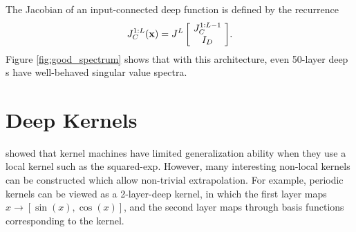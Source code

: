 %
%
%
The Jacobian of an input-connected deep function is defined by the recurrence
%
\newcommand{\sbi}[2]{\left[ \! \begin{array}{c} #1 \\ #2 \end{array} \! \right]} 
\begin{align}
{J_C^{1:L}(\vx) = J^L \sbi{ J_C^{1:L-1}}{I_D}}.
\end{align}
%
%
%
Figure \ref{fig:good_spectrum} shows that with this architecture, even 50-layer deep \gp{}s have well-behaved singular value spectra.














\section{Deep Kernels}
\label{sec:deep_kernels}


\cite{ bengio2006curse} showed that kernel machines have limited generalization ability when they use a local kernel such as the squared-exp.
However, many interesting non-local kernels can be constructed which allow non-trivial extrapolation.
For example, periodic kernels can be viewed as a 2-layer-deep kernel, in which the first layer maps $x \rightarrow [\sin(x), \cos(x)]$, and the second layer maps through basis functions corresponding to the  kernel.

